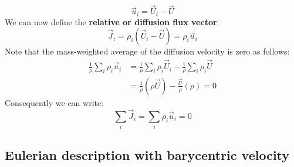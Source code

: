 \begin{equation}
\vec{u}_i = \vec{U}_i - \vec{U}
\label{eq:diffusionvelocity}
\end{equation}
We can now define the \textbf{relative or diffusion flux vector}:
\begin{equation}
\vec{J}_i = \rho_i ( \vec{U}_i - \vec{U}) = \rho_i \vec{u}_i
\label{eq:diffusionflux}
\end{equation}
Note that the mass-weighted average of the diffusion velocity is zero as follows:
\begin{align}
\frac{1}{\rho} \sum_i \rho_i \vec{u}_i &= \frac{1}{\rho} \sum_i \rho_i \vec{U}_i - \frac{1}{\rho} \sum_i \rho_i \vec{U}\\
&= \frac{1}{\rho} (\rho \vec{U}) - \frac{\vec{U}}{\rho} (\rho) = 0
\end{align}
Consequently we can write:
\begin{equation}
\sum_i \vec{J}_i = \sum_i \rho_i \vec{u}_i = 0
\end{equation}
\subsection{Eulerian description with barycentric velocity}
\\


